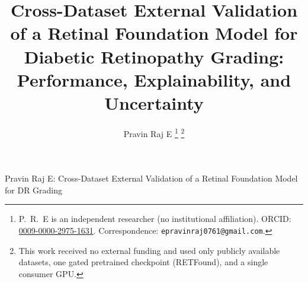 \documentclass[journal]{IEEEtran}
\renewcommand{\_}{\origunderscore\allowbreak}
\begin{document}
\title{Cross-Dataset External Validation of a Retinal Foundation Model for
Diabetic Retinopathy Grading: Performance, Explainability, and Uncertainty}

\author{Pravin Raj E%
\thanks{P.\ R.\ E is an independent researcher (no institutional
affiliation). ORCID: \href{https://orcid.org/0009-0000-2975-1631}{0009-0000-2975-1631}.
Correspondence: \texttt{epravinraj0761@gmail.com}.}%
\thanks{This work received no external funding and used only publicly available
datasets, one gated pretrained checkpoint (RETFound), and a single consumer GPU.}}

%
{Pravin Raj E: Cross-Dataset External Validation of a Retinal Foundation Model for DR Grading}

\maketitle
\end{document}
